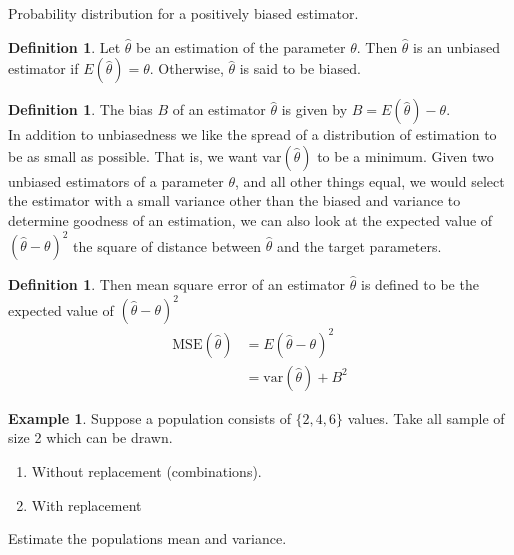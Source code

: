 \documentclass[11pt,a4paper]{article}
\theoremstyle{definition}
\newtheorem{definition}[thm]{Definition}
\newtheorem{example}[thm]{Example}
\begin{document}
Probability distribution for a positively biased estimator.\\


\begin{definition}
Let $\hat{\theta}$ be an estimation of the parameter $\theta$. Then $\hat{\theta}$ is an unbiased estimator if $E(\hat{\theta})=\theta$. Otherwise, $\hat{\theta}$ is said to be biased.\\
\end{definition}



\begin{definition}
The bias $B$ of an estimator $\hat{\theta}$ is given by $B=E(\hat{\theta})-\theta$.\\ 

In addition to unbiasedness we like the spread of a distribution of estimation to be as small as possible. That is, we want var$(\hat{\theta})$ to be a minimum. Given two unbiased estimators of a parameter $\theta$, and all other things equal, we would select the estimator with a small variance other than the biased and variance to determine goodness of an estimation, we can also look at the expected value of $(\hat{\theta}-\theta)^2$ the square of distance between $\hat{\theta}$ and the target parameters.\\
\end{definition}



\begin{definition}
Then mean square error of an estimator $\hat{\theta}$ is defined to be the expected value of $(\hat{\theta}-\theta)^2$
\begin{align*}
\text{MSE}(\hat{\theta}) &=E(\hat{\theta}-\theta)^2\\
&=\text{var}(\hat{\theta})+B^2
\end{align*}
\end{definition}





\begin{example}
Suppose a population consists of $\{2,4,6\}$ values. Take all sample of size 2 which can be drawn.
\begin{enumerate}
\item Without replacement (combinations).
\item With replacement
\end{enumerate}
Estimate the populations mean and variance.\\
\end{example}
\end{document}
